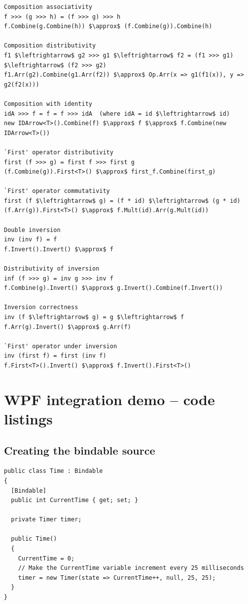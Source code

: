 \documentclass[12pt,twoside,notitlepage]{report}
\begin{document}
\begin{samepage}
\begin{lstlisting}[mathescape]
Composition associativity
f >>> (g >>> h) = (f >>> g) >>> h
f.Combine(g.Combine(h)) $\approx$ (f.Combine(g)).Combine(h)

Composition distributivity
f1 $\leftrightarrow$ g2 >>> g1 $\leftrightarrow$ f2 = (f1 >>> g1) $\leftrightarrow$ (f2 >>> g2)
f1.Arr(g2).Combine(g1.Arr(f2)) $\approx$ Op.Arr(x => g1(f1(x)), y => g2(f2(x)))

Composition with identity
idA >>> f = f = f >>> idA  (where idA = id $\leftrightarrow$ id)
new IDArrow<T>().Combine(f) $\approx$ f $\approx$ f.Combine(new IDArrow<T>())

`First' operator distributivity
first (f >>> g) = first f >>> first g
(f.Combine(g)).First<T>() $\approx$ first_f.Combine(first_g)

`First' operator commutativity
first (f $\leftrightarrow$ g) = (f * id) $\leftrightarrow$ (g * id)
(f.Arr(g)).First<T>() $\approx$ f.Mult(id).Arr(g.Mult(id))

Double inversion
inv (inv f) = f
f.Invert().Invert() $\approx$ f

Distributivity of inversion
inf (f >>> g) = inv g >>> inv f
f.Combine(g).Invert() $\approx$ g.Invert().Combine(f.Invert())

Inversion correctness
inv (f $\leftrightarrow$ g) = g $\leftrightarrow$ f
f.Arr(g).Invert() $\approx$ g.Arr(f)

`First' operator under inversion
inv (first f) = first (inv f)
f.First<T>().Invert() $\approx$ f.Invert().First<T>()
\end{lstlisting}
\end{samepage}

\cleardoublepage


\chapter{WPF integration demo -- code listings}  \label{sec:wpf_integration_code}

\section{Creating the bindable source}

\begin{lstlisting}
public class Time : Bindable
{
  [Bindable]
  public int CurrentTime { get; set; }

  private Timer timer;

  public Time()
  {
    CurrentTime = 0;
    // Make the CurrentTime variable increment every 25 milliseconds
    timer = new Timer(state => CurrentTime++, null, 25, 25);
  }
}
\end{lstlisting}
\end{document}
